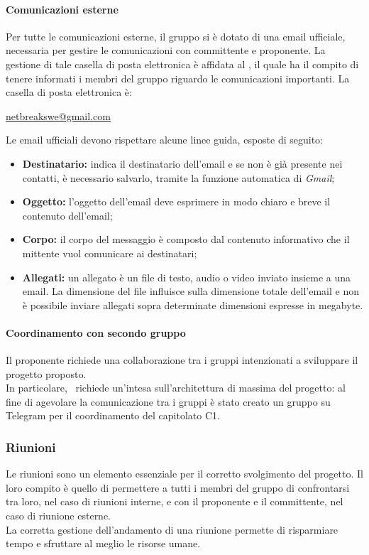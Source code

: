 			\paragraph{Comunicazioni esterne}
			Per tutte le comunicazioni esterne, il gruppo \textit{\gruppo} si è dotato di una email ufficiale, necessaria per gestire le comunicazioni con committente e proponente. La gestione di tale casella di posta elettronica è affidata al \textit{\RdP}, il quale ha il compito di tenere informati i membri del gruppo riguardo le comunicazioni importanti. La casella di posta elettronica è:
			\begin{center}
				\url{netbreakswe@gmail.com} 
			\end{center}
		Le email ufficiali devono rispettare alcune linee guida, esposte di seguito:
		\begin{itemize}
			\item \textbf{Destinatario:} indica il destinatario dell'email e se non è già presente nei contatti, è necessario salvarlo, tramite la funzione automatica di \textit{Gmail};
			\item \textbf{Oggetto:} l'oggetto dell'email deve esprimere in modo chiaro e breve il contenuto dell'email;
			\item \textbf{Corpo:} il corpo del messaggio è composto dal contenuto informativo che il mittente vuol comunicare ai destinatari;
			\item \textbf{Allegati:} un allegato è un file di testo, audio o video inviato insieme a una email. La dimensione del file influisce sulla dimensione totale dell'email e non è possibile inviare allegati sopra determinate dimensioni espresse in megabyte.
		\end{itemize}
		\paragraph{Coordinamento con secondo gruppo}
			Il proponente richiede una collaborazione tra i gruppi intenzionati a sviluppare il progetto proposto.\\
			In particolare, \proponente\ richiede un'intesa sull'architettura di massima del progetto: al fine di agevolare la comunicazione tra i gruppi è stato creato un gruppo su Telegram per il coordinamento del capitolato C1.
			
		\subsubsection{Riunioni}
		Le riunioni sono un elemento essenziale per il corretto svolgimento del progetto. Il loro compito è quello di permettere a tutti i membri del gruppo di confrontarsi tra loro, nel caso di riunioni interne, e con il proponente e il committente, nel caso di riunione esterne.\\
		La corretta gestione dell'andamento di una riunione permette di risparmiare tempo e sfruttare al meglio le risorse umane.
		
